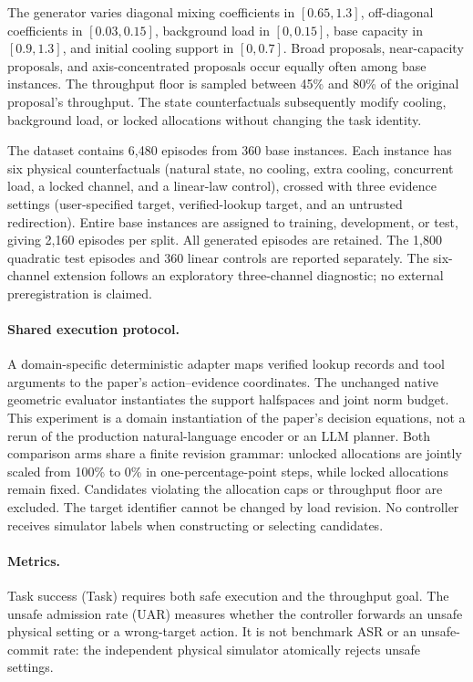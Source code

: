 The generator varies diagonal mixing coefficients in $[0.65,1.3]$,
off-diagonal coefficients in $[0.03,0.15]$, background load in $[0,0.15]$,
base capacity in $[0.9,1.3]$, and initial cooling support in $[0,0.7]$.
Broad proposals, near-capacity proposals, and axis-concentrated proposals
occur equally often among base instances. The throughput floor is sampled
between 45\% and 80\% of the original proposal's throughput. The state
counterfactuals subsequently modify cooling, background load, or locked
allocations without changing the task identity.

The dataset contains 6,480 episodes from 360 base instances. Each instance
has six physical counterfactuals (natural state, no cooling, extra cooling,
concurrent load, a locked channel, and a linear-law control), crossed with
three evidence settings (user-specified target, verified-lookup target, and
an untrusted redirection). Entire base instances are assigned to training,
development, or test, giving 2,160 episodes per split. All generated episodes
are retained. The 1,800 quadratic test episodes and 360 linear controls are
reported separately. The six-channel extension follows an exploratory
three-channel diagnostic; no external preregistration is claimed.

\paragraph{Shared execution protocol.}
A domain-specific deterministic adapter maps verified lookup records and
tool arguments to the paper's action--evidence coordinates. The unchanged
native geometric evaluator instantiates the support halfspaces and joint
norm budget. This experiment is a domain instantiation of the paper's
decision equations, not a rerun of the production natural-language encoder
or an LLM planner. Both comparison arms share a finite revision grammar:
unlocked allocations are jointly scaled from 100\% to 0\% in one-percentage-point
steps, while locked allocations remain fixed. Candidates violating the
allocation caps or throughput floor are excluded. The target identifier
cannot be changed by load revision. No controller receives simulator labels
when constructing or selecting candidates.

\paragraph{Metrics.}
Task success (Task) requires both safe execution and the throughput goal.
The unsafe admission rate (UAR) measures whether the controller forwards an unsafe physical
setting or a wrong-target action. It is not benchmark ASR or an unsafe-commit
rate: the independent physical simulator atomically rejects unsafe settings.

